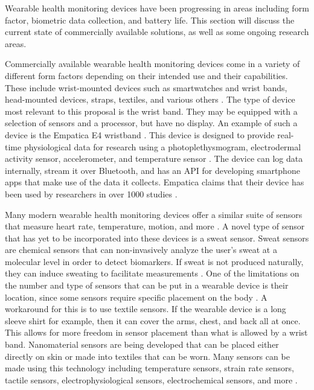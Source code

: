 Wearable health monitoring devices have been progressing in areas including
form factor, biometric data collection, and battery life.  This section will
discuss the current state of commercially available solutions, as well as some
ongoing research areas.

Commercially available wearable health monitoring devices come in a variety of
different form factors depending on their intended use and their capabilities.
These include wrist-mounted devices such as smartwatches and wrist bands,
head-mounted devices, straps, textiles, and various
others \cite{Seneviratne2017}.  The type of device most relevant to this
proposal is the wrist band.  They may be equipped with a selection of sensors
and a processor, but have no display.  An example of such a device is the Empatica
E4 wristband \cite{McCarthy2016}.  This device is designed to provide real-time
physiological data for research using a photoplethysmogram, electrodermal
activity sensor, accelerometer, and temperature sensor \cite{empatica}. The
device can log data internally, stream it over Bluetooth, and has an API for
developing smartphone apps that make use of the data it collects. Empatica
claims that their device has been used by researchers in over 1000 studies
\cite{empatica}.

Many modern wearable health monitoring devices offer a similar suite of sensors
that measure heart rate, temperature, motion, and more
\cite{Seneviratne2017}.  A novel type of sensor that has yet to be incorporated
into these devices is a sweat sensor.  Sweat sensors are chemical sensors that
can non-invasively analyze the user's sweat at a molecular level in order to
detect biomarkers.  If sweat is not produced naturally, they can induce
sweating to facilitate measurements \cite{Tai2018}.  One of the limitations on
the number and type of sensors that can be put in a wearable device is their
location, since some sensors require specific placement on the
body \cite{Baig2017}.  A workaround for this is to use textile sensors.  If the
wearable device is a long sleeve shirt for example, then it can cover the arms,
chest, and back all at once.  This allows for more freedom in sensor placement
than what is allowed by a wrist band.  Nanomaterial sensors are being developed
that can be placed either directly on skin or made into textiles that can be
worn.  Many sensors can be made using this technology including temperature
sensors, strain rate sensors, tactile sensors, electrophysiological sensors,
electrochemical sensors, and more \cite{Yai2018}.

